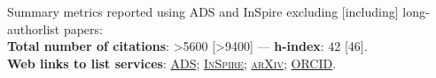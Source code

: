 Summary metrics reported using ADS and InSpire excluding [including] long-authorlist papers:
\\
\textcolor{mark_color}{\textbf{Total number of citations}}: >5600 [>9400]
 --- 
\textcolor{mark_color}{\textbf{h-index}}: 42 [46].
\\
\textcolor{mark_color}{\textbf{Web links to list services}}:
\href{https://davidegerosa.com/myads}{\textsc{ADS}};
\href{https://davidegerosa.com/myinspire}{\textsc{InSpire}};
\href{http://davidegerosa.com/myarxiv}{\textsc{arXiv}};
\href{https://davidegerosa.com/myorcid}{\textsc{ORCID}}.